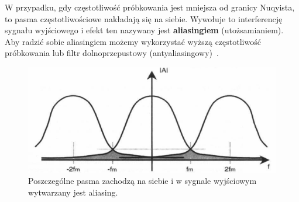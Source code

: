 \documentclass[wi]{zut}
\begin{document}
W przypadku, gdy częstotliwość próbkowania jest mniejsza od granicy Nuqyista, to pasma częstotliwościowe nakładają się na siebie. Wywołuje to interferencję sygnału wyjściowego i efekt ten nazywany jest \textbf{aliasingiem} (utożsamianiem). Aby radzić sobie aliasingiem możemy wykorzystać wyższą częstotliwość próbkowania lub filtr dolnoprzepustowy (antyaliasingowy)~\cite{Cariow_3}.

\begin{figure}[H]
    \centering
    \includegraphics[width=0.7\linewidth]{images/aliasign.png}
    \caption{Poszczególne pasma zachodzą na siebie i w sygnale wyjściowym wytwarzany jest aliasing.}
    \label{fig:aliasign}
\end{figure}






\end{document}
